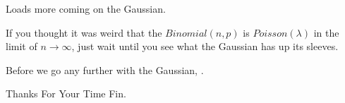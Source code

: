 \documentclass[10pt,sans,english,compress,xcolor=dvipsnames]{beamer}
\begin{document}
\begin{frame}{Loads more coming on the Gaussian.}

If you thought it was weird that the $Binomial(n,p)$ is $Poisson(\lambda)$ in the limit of $n\rightarrow \infty$, just wait until you see what the Gaussian has up its sleeves.\\[1ex]

\vspace{0.5cm}

Before we go any further with the Gaussian, .\\[1ex]
\end{frame}



\begin{frame}{Thanks For Your Time}
\center
\Huge
Fin.
\end{frame}
\end{document}
